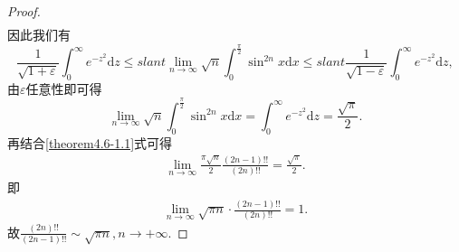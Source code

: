 \documentclass[../../main.tex]{subfiles}
\begin{document}
\begin{proof}
\begin{align*}
\end{align*}
因此我们有
\[
\frac{1}{\sqrt{1 + \varepsilon}}\int_{0}^{\infty}e^{-z^{2}}\mathrm{d}z\leqslant slant\lim_{n\rightarrow\infty}\sqrt{n}\int_{0}^{\frac{\pi}{2}}\sin^{2n}x \mathrm{d}x\leqslant slant\frac{1}{\sqrt{1 - \varepsilon}}\int_{0}^{\infty}e^{-z^{2}}\mathrm{d}z,
\]
由\(\varepsilon\)任意性即可得
\[
\lim_{n\rightarrow\infty}\sqrt{n}\int_{0}^{\frac{\pi}{2}}\sin^{2n}x \mathrm{d}x=\int_{0}^{\infty}e^{-z^{2}}\mathrm{d}z=\frac{\sqrt{\pi}}{2}.
\]
再结合\eqref{theorem4.6-1.1}式可得
\begin{align*}
\lim_{n\rightarrow \infty} \frac{\pi \sqrt{n}}{2}\frac{(2n-1)!!}{(2n)!!}=\frac{\sqrt{\pi}}{2}.
\end{align*}
即
\begin{align*}
\lim_{n\rightarrow \infty} \sqrt{\pi n}\cdot \frac{(2n-1)!!}{(2n)!!}=1.
\end{align*}
故$\frac{(2n)!!}{(2n-1)!!}\sim \sqrt{\pi n},n\rightarrow +\infty $.
\end{proof}
\end{document}
